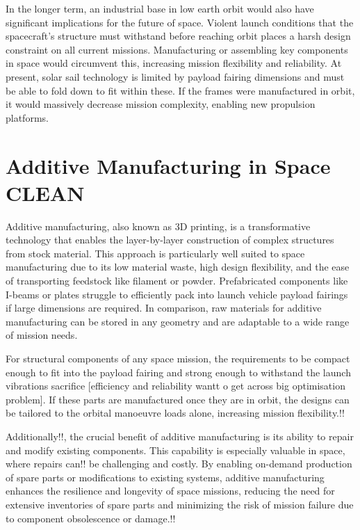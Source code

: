 In the longer term, an industrial base in low earth orbit would also have significant implications for the future of space. Violent launch conditions that the spacecraft's structure must withstand before reaching orbit places a harsh design constraint on all current missions. Manufacturing or assembling key components in space would circumvent this, increasing mission flexibility and reliability. At present, solar sail technology is limited by payload fairing dimensions and must be able to fold down to fit within these. If the frames were manufactured in orbit, it would massively decrease mission complexity, enabling new propulsion platforms.

\newpage
\section{Additive Manufacturing in Space CLEAN}
Additive manufacturing, also known as 3D printing, is a transformative technology that enables the layer-by-layer construction of complex structures from stock material. This approach is particularly well suited to space manufacturing due to its low material waste, high design flexibility, and the ease of transporting feedstock like filament or powder. Prefabricated components like I-beams or plates struggle to efficiently pack into launch vehicle payload fairings if large dimensions are required. In comparison, raw materials for additive manufacturing can be stored in any geometry and are adaptable to a wide range of mission needs.

For structural components of any space mission, the requirements to be compact enough to fit into the payload fairing and strong enough to withstand the launch vibrations sacrifice [efficiency and reliability wantt o get across big optimisation problem]. If these parts are manufactured once they are in orbit, the designs can be tailored to the orbital manoeuvre loads alone, increasing mission flexibility.!!

Additionally!!, the crucial benefit of additive manufacturing is its ability to repair and modify existing components. This capability is especially valuable in space, where repairs can!! be challenging and costly. By enabling on-demand production of spare parts or modifications to existing systems, additive manufacturing enhances the resilience and longevity of space missions, reducing the need for extensive inventories of spare parts and minimizing the risk of mission failure due to component obsolescence or damage.!!



